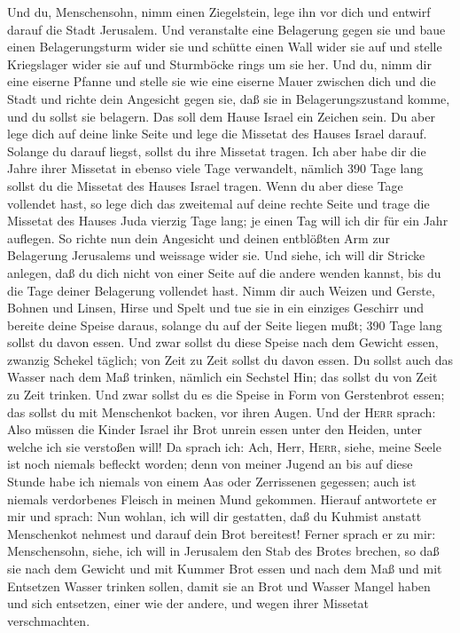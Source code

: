  Und du, Menschensohn, nimm einen Ziegelstein, lege ihn
vor dich und entwirf darauf die Stadt Jerusalem.  Und
veranstalte eine Belagerung gegen sie und baue einen Belagerungsturm
wider sie und schütte einen Wall wider sie auf und stelle Kriegslager
wider sie auf und Sturmböcke rings um sie her.  Und du,
nimm dir eine eiserne Pfanne und stelle sie wie eine eiserne Mauer
zwischen dich und die Stadt und richte dein Angesicht gegen sie, daß sie
in Belagerungszustand komme, und du sollst sie belagern. Das soll dem
Hause Israel ein Zeichen sein.  Du aber lege dich auf
deine linke Seite und lege die Missetat des Hauses Israel darauf.
Solange du darauf liegst, sollst du ihre Missetat tragen. 
Ich aber habe dir die Jahre ihrer Missetat in ebenso viele Tage
verwandelt, nämlich 390 Tage lang sollst du die Missetat des Hauses
Israel tragen.  Wenn du aber diese Tage vollendet hast, so
lege dich das zweitemal auf deine rechte Seite und trage die Missetat
des Hauses Juda vierzig Tage lang; je einen Tag will ich dir für ein
Jahr auflegen.  So richte nun dein Angesicht und deinen
entblößten Arm zur Belagerung Jerusalems und weissage wider sie.
 Und siehe, ich will dir Stricke anlegen, daß du dich
nicht von einer Seite auf die andere wenden kannst, bis du die Tage
deiner Belagerung vollendet hast.  Nimm dir auch Weizen
und Gerste, Bohnen und Linsen, Hirse und Spelt und tue sie in ein
einziges Geschirr und bereite deine Speise daraus, solange du auf der
Seite liegen mußt; 390 Tage lang sollst du davon essen. 
Und zwar sollst du diese Speise nach dem Gewicht essen, zwanzig Schekel
täglich; von Zeit zu Zeit sollst du davon essen.  Du
sollst auch das Wasser nach dem Maß trinken, nämlich ein Sechstel Hin;
das sollst du von Zeit zu Zeit trinken.  Und zwar sollst
du es die Speise in Form von Gerstenbrot essen; das sollst du mit
Menschenkot backen, vor ihren Augen.  Und der
\textsc{Herr} sprach: Also müssen die Kinder Israel ihr Brot unrein
essen unter den Heiden, unter welche ich sie verstoßen will!
 Da sprach ich: Ach, Herr, \textsc{Herr}, siehe, meine
Seele ist noch niemals befleckt worden; denn von meiner Jugend an bis
auf diese Stunde habe ich niemals von einem Aas oder Zerrissenen
gegessen; auch ist niemals verdorbenes Fleisch in meinen Mund gekommen.
 Hierauf antwortete er mir und sprach: Nun wohlan, ich
will dir gestatten, daß du Kuhmist anstatt Menschenkot nehmest und
darauf dein Brot bereitest!  Ferner sprach er zu mir:
Menschensohn, siehe, ich will in Jerusalem den Stab des Brotes brechen,
so daß sie nach dem Gewicht und mit Kummer Brot essen und nach dem Maß
und mit Entsetzen Wasser trinken sollen,  damit sie an
Brot und Wasser Mangel haben und sich entsetzen, einer wie der andere,
und wegen ihrer Missetat verschmachten.

